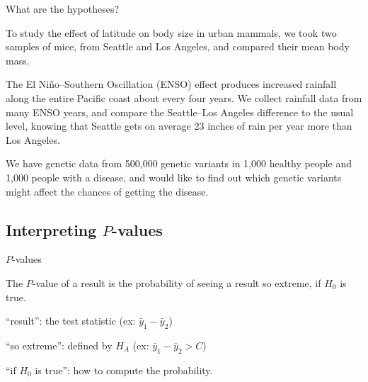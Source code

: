 \begin{frame}{What are the hypotheses?}

  To study the effect of latitude on body size in urban mammals, 
  we took two samples of mice, from Seattle and Los Angeles,
  and compared their mean body mass.

    \vspace{2em}

  The El Ni\~no--Southern Oscillation (ENSO) effect produces increased rainfall along the entire Pacific coast about every four years.
  We collect rainfall data from many ENSO years, and compare the Seattle--Los Angeles difference to the usual level,
  knowing that Seattle gets on average 23 inches of rain per year more than Los Angeles.


    \vspace{2em}

  We have genetic data from 500,000 genetic variants in 1,000 healthy people and 1,000 people with a disease,
  and would like to find out which genetic variants might affect the chances of getting the disease.

\end{frame}



\subsection{Interpreting $P$-values}


\begin{frame}{$P$-values}

    \begin{block}{}
        The \alert<1>{$P$-value} of a \alert<2>{result} is the probability of seeing a result \alert<3>{so extreme}, if $H_0$ is true.
    \end{block}

    \vspace{2em}

    \begin{itemizew}{4em}
        \item[``result'':] the test statistic (ex: $\bar y_1 - \bar y_2$)
        \item[``so extreme'':] defined by $H_A$ (ex: $\bar y_1 - \bar y_2 > C$)
        \item[``if $H_0$ is true'':] how to compute the probability.
    \end{itemizew}

\end{frame}


